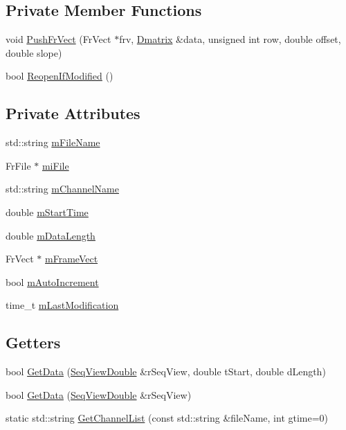 \subsection*{Private Member Functions}
\begin{DoxyCompactItemize}
\item 
void \hyperlink{classtsa_1_1_frame_i_channel_aaca5759288add902732cc640633f17d4}{Push\+Fr\+Vect} (Fr\+Vect $\ast$frv, \hyperlink{namespacetsa_ad260cd21c1891c4ed391fe788569aba4}{Dmatrix} \&data, unsigned int row, double offset, double slope)
\item 
bool \hyperlink{classtsa_1_1_frame_i_channel_a8049d4e90ebecce30c7f60573da7fe87}{Reopen\+If\+Modified} ()
\end{DoxyCompactItemize}
\subsection*{Private Attributes}
\begin{DoxyCompactItemize}
\item 
std\+::string \hyperlink{classtsa_1_1_frame_i_channel_a252988d4bbef0e293be14f3637edc7ef}{m\+File\+Name}
\item 
Fr\+File $\ast$ \hyperlink{classtsa_1_1_frame_i_channel_aa679a81dbcec2ca8c7126d092de59651}{mi\+File}
\item 
std\+::string \hyperlink{classtsa_1_1_frame_i_channel_a7cc80840311ef703c68393f95b077f9a}{m\+Channel\+Name}
\item 
double \hyperlink{classtsa_1_1_frame_i_channel_affbd1b60487a643f2bdec4875f4d3643}{m\+Start\+Time}
\item 
double \hyperlink{classtsa_1_1_frame_i_channel_a32e512e479d9f8eb1de5b7a4cfd53254}{m\+Data\+Length}
\item 
Fr\+Vect $\ast$ \hyperlink{classtsa_1_1_frame_i_channel_a12a55e4ea728e58b37c811fe93a7d774}{m\+Frame\+Vect}
\item 
bool \hyperlink{classtsa_1_1_frame_i_channel_a90c8009f4280dfee6a8f61b97f246a25}{m\+Auto\+Increment}
\item 
time\+\_\+t \hyperlink{classtsa_1_1_frame_i_channel_a7a643eb00f14d0bbd02f1b04e4e3ccdc}{m\+Last\+Modification}
\end{DoxyCompactItemize}
\subsection*{Getters}
\begin{DoxyCompactItemize}
\item 
bool \hyperlink{classtsa_1_1_frame_i_channel_a9e8d07780eb81e8c4a373c3b49932df3}{Get\+Data} (\hyperlink{namespacetsa_ac599574bcc094eda25613724b8f3ca9e}{Seq\+View\+Double} \&r\+Seq\+View, double t\+Start, double d\+Length)
\item 
bool \hyperlink{classtsa_1_1_frame_i_channel_a0c17cedafee827df1662036795cd954c}{Get\+Data} (\hyperlink{namespacetsa_ac599574bcc094eda25613724b8f3ca9e}{Seq\+View\+Double} \&r\+Seq\+View)
\item 
static std\+::string \hyperlink{classtsa_1_1_frame_i_channel_aaab838f283b44ecf0d52842e99406146}{Get\+Channel\+List} (const std\+::string \&file\+Name, int gtime=0)
\end{DoxyCompactItemize}


